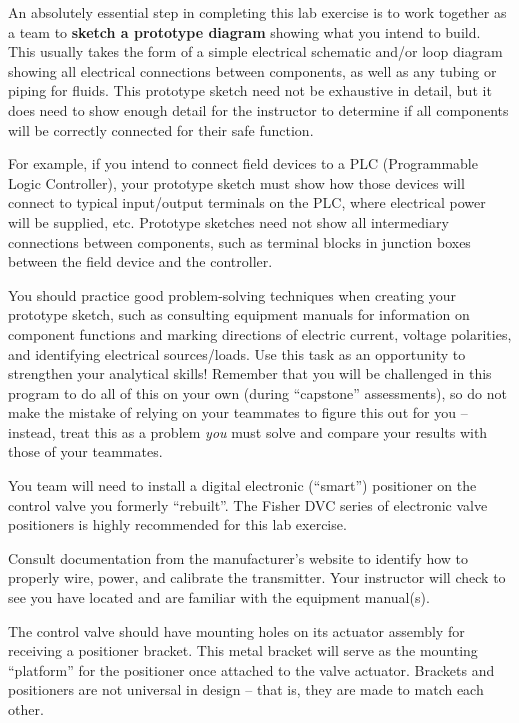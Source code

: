 \vskip 10pt

An absolutely essential step in completing this lab exercise is to work together as a team to {\bf sketch a prototype diagram} showing what you intend to build.  This usually takes the form of a simple electrical schematic and/or loop diagram showing all electrical connections between components, as well as any tubing or piping for fluids.  This prototype sketch need not be exhaustive in detail, but it does need to show enough detail for the instructor to determine if all components will be correctly connected for their safe function.

For example, if you intend to connect field devices to a PLC (Programmable Logic Controller), your prototype sketch must show how those devices will connect to typical input/output terminals on the PLC, where electrical power will be supplied, etc.  Prototype sketches need not show all intermediary connections between components, such as terminal blocks in junction boxes between the field device and the controller.

You should practice good problem-solving techniques when creating your prototype sketch, such as consulting equipment manuals for information on component functions and marking directions of electric current, voltage polarities, and identifying electrical sources/loads.  Use this task as an opportunity to strengthen your analytical skills!  Remember that you will be challenged in this program to do all of this on your own (during ``capstone'' assessments), so do not make the mistake of relying on your teammates to figure this out for you -- instead, treat this as a problem {\it you} must solve and compare your results with those of your teammates.

\vskip 10pt

You team will need to install a digital electronic (``smart'') positioner on the control valve you formerly ``rebuilt''.  The Fisher DVC series of electronic valve positioners is highly recommended for this lab exercise.

Consult documentation from the manufacturer's website to identify how to properly wire, power, and calibrate the transmitter.  Your instructor will check to see you have located and are familiar with the equipment manual(s).

The control valve should have mounting holes on its actuator assembly for receiving a positioner bracket.  This metal bracket will serve as the mounting ``platform'' for the positioner once attached to the valve actuator.  Brackets and positioners are not universal in design -- that is, they are made to match each other.

